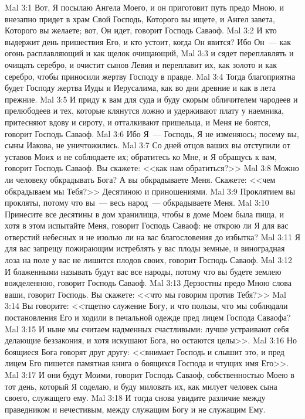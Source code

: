 \vs Mal 3:1 Вот, Я посылаю Ангела Моего, и он приготовит путь предо Мною, и внезапно придет в храм Свой Господь, Которого вы ищете, и Ангел завета, Которого вы желаете; вот, Он идет, говорит Господь Саваоф.
\vs Mal 3:2 И кто выдержит день пришествия Его, и кто устоит, когда Он явится? Ибо Он~--- как огонь расплавляющий и как щелок очищающий,
\vs Mal 3:3 и сядет переплавлять и очищать серебро, и очистит сынов Левия и переплавит их, как золото и как серебро, чтобы приносили жертву Господу в правде.
\vs Mal 3:4 Тогда благоприятна будет Господу жертва Иуды и Иерусалима, как во дни древние и как в лета прежние.
\vs Mal 3:5 И приду к вам для суда и буду скорым обличителем чародеев и прелюбодеев и тех, которые клянутся ложно и удерживают плату у наемника, притесняют вдову и сироту, и отталкивают пришельца, и Меня не боятся, говорит Господь Саваоф.
\vs Mal 3:6 Ибо Я~--- Господь, Я не изменяюсь; посему вы, сыны Иакова, не уничтожились.
\vs Mal 3:7 Со дней отцов ваших вы отступили от уставов Моих и не соблюдаете их; обратитесь ко Мне, и Я обращусь к вам, говорит Господь Саваоф. Вы скажете: <<как нам обратиться?>>
\vs Mal 3:8 Можно ли человеку обкрадывать Бога? А вы обкрадываете Меня. Скажете: <<чем обкрадываем мы Тебя?>> Десятиною и приношениями.
\vs Mal 3:9 Проклятием вы прокляты, потому что вы~--- весь народ~--- обкрадываете Меня.
\vs Mal 3:10 Принесите все десятины в дом хранилища, чтобы в доме Моем была пища, и хотя в этом испытайте Меня, говорит Господь Саваоф: не открою ли Я для вас отверстий небесных и не изолью ли на вас благословения до избытка?
\vs Mal 3:11 Я для вас запрещу пожирающим истреблять у вас плоды земные, и виноградная лоза на поле у вас не лишится плодов своих, говорит Господь Саваоф.
\vs Mal 3:12 И блаженными называть будут вас все народы, потому что вы будете землею вожделенною, говорит Господь Саваоф.
\vs Mal 3:13 Дерзостны предо Мною слова ваши, говорит Господь. Вы скажете: <<что мы говорим против Тебя?>>
\vs Mal 3:14 Вы говорите: <<тщетно служение Богу, и что пользы, что мы соблюдали постановления Его и ходили в печальной одежде пред лицем Господа Саваофа?
\vs Mal 3:15 И ныне мы считаем надменных счастливыми: лучше устраивают себя делающие беззакония, и хотя искушают Бога, но остаются целы>>.
\vs Mal 3:16 Но боящиеся Бога говорят друг другу: <<внимает Господь и слышит это, и пред лицем Его пишется памятная книга о боящихся Господа и чтущих имя Его>>.
\vs Mal 3:17 И они будут Моими, говорит Господь Саваоф, собственностью Моею в тот день, который Я соделаю, и буду миловать их, как милует человек сына своего, служащего ему.
\vs Mal 3:18 И тогда снова увидите различие между праведником и нечестивым, между служащим Богу и не служащим Ему.
